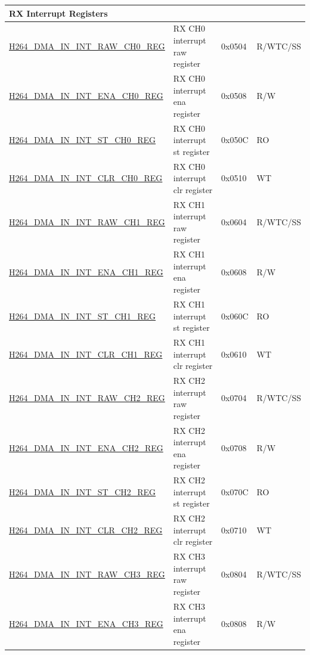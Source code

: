 \begin{longtable}{ | p{7.5cm} | p{5.7cm} | p{1.2cm} | p{1cm} | }
    \multicolumn{4}{|l|}{\textbf{RX Interrupt Registers}} \\ \hline
    \hyperref[regdesc:H264DMAININTRAWCH0REG]
    {H264\_DMA\_IN\_INT\_RAW\_CH0\_REG} & RX CH0  interrupt raw register & 0x0504 & R/WTC/SS \\ \hline
    \hyperref[regdesc:H264DMAININTENACH0REG]{H264\_DMA\_IN\_INT\_ENA\_CH0\_REG} & RX CH0  interrupt ena register & 0x0508 & R/W \\ \hline
    \hyperref[regdesc:H264DMAININTSTCH0REG]{H264\_DMA\_IN\_INT\_ST\_CH0\_REG} & RX CH0  interrupt st register & 0x050C & RO \\ \hline
    \hyperref[regdesc:H264DMAININTCLRCH0REG]{H264\_DMA\_IN\_INT\_CLR\_CH0\_REG} & RX CH0  interrupt clr register & 0x0510 & WT \\ \hline
    \hyperref[regdesc:H264DMAININTRAWCH1REG]{H264\_DMA\_IN\_INT\_RAW\_CH1\_REG} & RX CH1  interrupt raw register & 0x0604 & R/WTC/SS \\ \hline
    \hyperref[regdesc:H264DMAININTENACH1REG]{H264\_DMA\_IN\_INT\_ENA\_CH1\_REG} & RX CH1  interrupt ena register & 0x0608 & R/W \\ \hline
    \hyperref[regdesc:H264DMAININTSTCH1REG]{H264\_DMA\_IN\_INT\_ST\_CH1\_REG} & RX CH1  interrupt st register & 0x060C & RO \\ \hline
    \hyperref[regdesc:H264DMAININTCLRCH1REG]{H264\_DMA\_IN\_INT\_CLR\_CH1\_REG} & RX CH1  interrupt clr register & 0x0610 & WT \\ \hline
    \hyperref[regdesc:H264DMAININTRAWCH2REG]{H264\_DMA\_IN\_INT\_RAW\_CH2\_REG} & RX CH2  interrupt raw register & 0x0704 & R/WTC/SS \\ \hline
    \hyperref[regdesc:H264DMAININTENACH2REG]{H264\_DMA\_IN\_INT\_ENA\_CH2\_REG} & RX CH2  interrupt ena register & 0x0708 & R/W \\ \hline
    \hyperref[regdesc:H264DMAININTSTCH2REG]{H264\_DMA\_IN\_INT\_ST\_CH2\_REG} & RX CH2  interrupt st register & 0x070C & RO \\ \hline
    \hyperref[regdesc:H264DMAININTCLRCH2REG]{H264\_DMA\_IN\_INT\_CLR\_CH2\_REG} & RX CH2  interrupt clr register & 0x0710 & WT \\ \hline
    \hyperref[regdesc:H264DMAININTRAWCH3REG]{H264\_DMA\_IN\_INT\_RAW\_CH3\_REG} & RX CH3  interrupt raw register & 0x0804 & R/WTC/SS \\ \hline
    \hyperref[regdesc:H264DMAININTENACH3REG]{H264\_DMA\_IN\_INT\_ENA\_CH3\_REG} & RX CH3  interrupt ena register & 0x0808 & R/W \\ \hline

\end{longtable}

